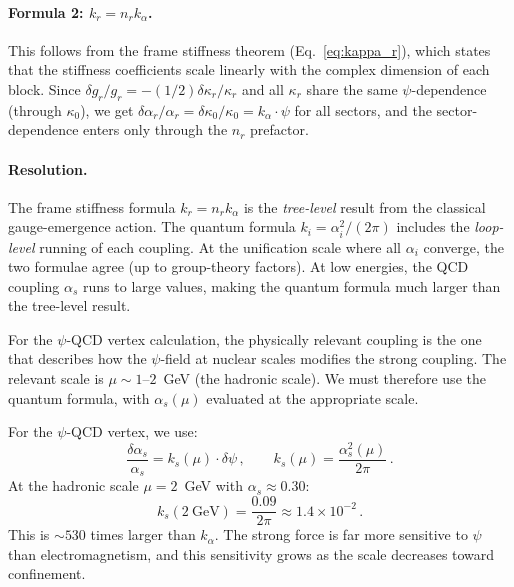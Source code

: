 \documentclass[aps,prd,twocolumn,superscriptaddress,floatfix,nofootinbib]{revtex4-2}
\newcommand{\kap}{\kappa}
\newcommand{\as}{\alpha_s}
\newcommand{\ka}{k_\alpha}
\newcommand{\ks}{k_s}
\newcommand{\dpsi}{\delta\psi}
\begin{document}
\paragraph{Formula 2: $k_r = n_r \ka$.}
This follows from the frame stiffness theorem
(Eq.~\eqref{eq:kappa_r}), which states that the stiffness coefficients
scale linearly with the complex dimension of each block. Since
$\delta g_r/g_r = -(1/2)\delta\kap_r/\kap_r$ and all $\kap_r$ share the
same $\psi$-dependence (through $\kap_0$), we get
$\delta\alpha_r/\alpha_r = \delta\kap_0/\kap_0 = \ka \cdot \psi$ for all
sectors, and the sector-dependence enters only through the $n_r$ prefactor.

\paragraph{Resolution.}
The frame stiffness formula $k_r = n_r \ka$ is the \emph{tree-level} result
from the classical gauge-emergence action. The quantum formula
$k_i = \alpha_i^2/(2\pi)$ includes the \emph{loop-level} running of each
coupling. At the unification scale where all $\alpha_i$ converge, the two
formulae agree (up to group-theory factors). At low energies, the QCD
coupling $\as$ runs to large values, making the quantum formula much larger
than the tree-level result.

For the $\psi$-QCD vertex calculation, the physically relevant coupling is
the one that describes how the $\psi$-field at nuclear scales modifies the
strong coupling. The relevant scale is $\mu \sim 1$--$2$~GeV (the hadronic
scale). We must therefore use the quantum formula, with $\as(\mu)$ evaluated
at the appropriate scale.

\begin{tcolorbox}[colback=blue!5!white, colframe=blue!50!black,
  title=Choice of $\psi$--SU(3) coupling]
For the $\psi$-QCD vertex, we use:
\begin{equation}
\frac{\delta\as}{\as} = \ks(\mu) \cdot \dpsi \, , \qquad
\ks(\mu) = \frac{\as^2(\mu)}{2\pi} \, .
\label{eq:ks_quantum}
\end{equation}
At the hadronic scale $\mu = 2$~GeV with $\as \approx 0.30$:
\begin{equation}
\ks(2~\text{GeV}) = \frac{0.09}{2\pi} \approx 1.4 \times 10^{-2} \, .
\end{equation}
This is $\sim 530$ times larger than $\ka$. The strong force is far more
sensitive to $\psi$ than electromagnetism, and this sensitivity grows as
the scale decreases toward confinement.
\end{tcolorbox}
\end{document}
